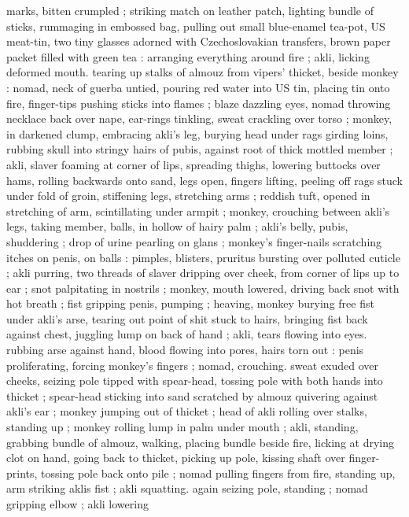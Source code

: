 marks, bitten crumpled ; striking match on leather patch, lighting 
bundle of sticks, rummaging in embossed bag, pulling out small 
blue-enamel tea-pot, US meat-tin, two tiny glasses adorned with 
Czechoslovakian transfers, brown paper packet filled with green tea 
: arranging everything around fire ; akli, licking deformed mouth. 
tearing up stalks of almouz from vipers' thicket, beside monkey : 
nomad, neck of guerba untied, pouring red water into US tin, placing 
tin onto fire, finger-tips pushing sticks into flames ; blaze dazzling 
eyes, nomad throwing necklace back over nape, ear-rings tinkling, 
sweat crackling over torso ; monkey, in darkened clump, embracing 
akli's leg, burying head under rags girding loins, rubbing skull into 
stringy hairs of pubis, against root of thick mottled member ; akli, 
slaver foaming at corner of lips, spreading thighs, lowering buttocks 
over hams, rolling backwards onto sand, legs open, fingers lifting, 
peeling off rags stuck under fold of groin, stiffening legs, stretching 
arms ; reddish tuft, opened in stretching of arm, scintillating under 
armpit ; monkey, crouching between akli's legs, taking member, balls, 
in hollow of hairy palm ; akli's belly, pubis, shuddering ; drop of 
urine pearling on glans ; monkey's finger-nails scratching itches on 
penis, on balls : pimples, blisters, pruritus bursting over polluted 
cuticle ; akli purring, two threads of slaver dripping over cheek, from 
corner of lips up to ear ; snot palpitating in nostrils ; monkey, mouth 
lowered, driving back snot with hot breath ; fist gripping penis, 
pumping ; heaving, monkey burying free fist under akli's arse, 
tearing out point of shit stuck to hairs, bringing fist back against 
chest, juggling lump on back of hand ; akli, tears flowing into eyes. 
rubbing arse against hand, blood flowing into pores, hairs torn out : 
penis proliferating, forcing monkey's fingers ; nomad, crouching. 
sweat exuded over cheeks, seizing pole tipped with spear-head, 
tossing pole with both hands into thicket ; spear-head sticking into 
sand scratched by almouz quivering against akli's ear ; monkey 
jumping out of thicket ; head of akli rolling over stalks, standing up 
; monkey rolling lump in palm under mouth ; akli, standing, grabbing 
bundle of almouz, walking, placing bundle beside fire, licking at 
drying clot on hand, going back to thicket, picking up pole, kissing 
shaft over finger-prints, tossing pole back onto pile ; nomad pulling 
fingers from fire, standing up, arm striking aklis fist ; akli squatting. 
again seizing pole, standing ; nomad gripping elbow ; akli lowering 
